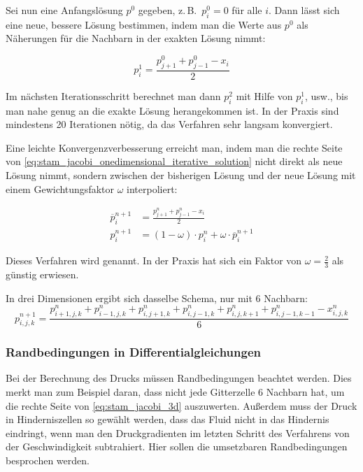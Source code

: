 Sei nun eine Anfangslösung $p^0$ gegeben, z.\,B.\ $p^0_i = 0$ für alle $i$.
Dann lässt sich eine neue, bessere Lösung bestimmen, indem man die Werte aus
$p^0$ als Näherungen für die Nachbarn in der exakten Lösung nimmt:

\begin{equation}
\label{eq:stam_jacobi_onedimensional_iterative_solution}
p_i^1
=
\frac{
	p_{j+1}^{0} + p_{j-1}^{0} - x_i
}
{
	2
}
\end{equation}

Im nächsten Iterationsschritt berechnet man dann $p_i^2$ mit Hilfe von $p_i^1$,
usw., bis man nahe genug an die exakte Lösung herangekommen ist. In der Praxis
sind mindestens 20 Iterationen nötig, da das Verfahren sehr langsam konvergiert.

Eine leichte Konvergenzverbesserung erreicht man, indem man die rechte Seite von
\autoref{eq:stam_jacobi_onedimensional_iterative_solution} nicht direkt als neue
Lösung nimmt, sondern zwischen der bisherigen Lösung und der neue Lösung mit
einem Gewichtungsfaktor $\omega$ interpoliert:

\begin{align}
\overline{p}_i^{n+1}
&=
\frac{
	p_{j+1}^{n} + p_{j-1}^{n} - x_i
}
{
	2
} \\
p_i^{n+1}
&=
(1-\omega) \cdot p_i^n + \omega \cdot \overline{p}_i^{n+1}
\end{align}

Dieses Verfahren wird  genannt. In
der Praxis hat sich ein Faktor von $\omega=\frac{2}{3}$ als günstig erwiesen.

In drei Dimensionen ergibt sich dasselbe Schema, nur mit 6 Nachbarn:
\begin{equation}
\label{eq:stam_jacobi_3d}
p_{i,j,k}^{n+1}
=
\frac{
	p_{i+1,j,k}^n +
	p_{i-1,j,k}^n +
	p_{i,j+1,k}^n +
	p_{i,j-1,k}^n +
	p_{i,j,k+1}^n +
	p_{i,j-1,k-1}^n -
	x_{i,j,k}^n
}
{
	6
}
\end{equation}

\subsubsection{Randbedingungen in Differentialgleichungen}
\label{sec:stam_boundaries}

Bei der Berechnung des Drucks müssen Randbedingungen beachtet
werden. Dies merkt man zum Beispiel daran, dass nicht jede Gitterzelle
6 Nachbarn hat, um die rechte Seite von \autoref{eq:stam_jacobi_3d}
auszuwerten. Außerdem muss der Druck in Hinderniszellen so gewählt
werden, dass das Fluid nicht in das Hindernis eindringt, wenn man den
Druckgradienten im letzten Schritt des Verfahrens von der
Geschwindigkeit subtrahiert. Hier sollen die umsetzbaren
Randbedingungen besprochen werden.

